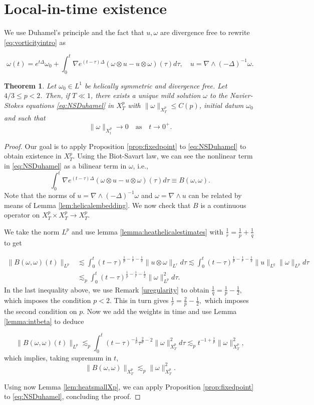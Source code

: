 \documentclass[11pt,a4paper]{article}
\newcommand{\w}{\omega}
\newcommand{\na}{\nabla}
\def\heat#1{e^{#1 \Delta}}
\newtheorem{thm}{Theorem}[section]
\begin{document}
\section{Local-in-time existence}\label{sec:localexistence}
We use Duhamel's principle and the fact that $u,\w$ are divergence free to rewrite \eqref{eq:vorticityintro} as

\begin{equation}\label{eq:NSDuhamel}
\w(t)=\heat{t}\w_0+\int_0^t\na\heat{(t-\tau)}(\w\otimes u-u\otimes \w)(\tau)d\tau, \quad u=\na\wedge(-\Delta)^{-1}\w.
\end{equation}

\begin{thm}\label{thm:existencesmallp}
Let $\w_0\in L^1$ be helically symmetric and divergence free. Let $4/3\leq p<2$. Then, if $T\ll1$, there exists a unique mild solution $\w$ to the Navier-Stokes equations \eqref{eq:NSDuhamel} in $X^p_T$ with $\|\w\|_{X^p_T}\leq C(p)$, initial datum $\w_0$ and such that
$$\|\w\|_{X^p_t}\to 0 \quad \text{as}\quad t\to 0^+.$$
\end{thm}

\begin{proof}
Our goal is to apply Proposition \ref{prop:fixedpoint} to \eqref{eq:NSDuhamel} to obtain existence in $X^p_T$. Using the Biot-Savart law, we can see the nonlinear term in \eqref{eq:NSDuhamel} as a bilinear term in $\w$, i.e., 
$$\int_0^t\na\heat{(t-\tau)}(\w\otimes u-u\otimes \w)(\tau)d\tau\equiv B(\w,\w).$$
Note that the norms of $u=\nabla\wedge(-\Delta)^{-1}\omega$ and $\w=\na\wedge u$ can be related by means of Lemma \ref{lem:helicalembedding}. We now check that $B$ is a continuous operator on $X^p_T\times X^p_T \to X^p_T$. 

We take the norm $L^p$ and use lemma \ref{lemma:heathelicalestimates} with $\frac{1}{r}=\frac{1}{p}+\frac{1}{q}$ to get

\begin{align*}
\|B(\w,\w)(t)\|_{L^p}&\lesssim \int_0^t (t-\tau)^{\frac{1}{p}-\frac{1}{r}-\frac{1}{2}}\|u\otimes \w\|_{L^r}d\tau
\lesssim \int_0^t (t-\tau)^{\frac{1}{p}-\frac{1}{r}-\frac{1}{2}}\|u\|_{L^q} \|\w\|_{L^p}d\tau \\
&\lesssim_p \int_0^t (t-\tau)^{\frac{1}{p}-\frac{1}{r}-\frac{1}{2}} \|\w\|^2_{L^p}d\tau.
\end{align*}
In the last inequality above, we use Remark \ref{uregularity} to obtain
$
\frac{1}{q}=\frac{1}{p}-\frac{1}{2},
$
which imposes the condition $p<2$. This in turn gives
$
\frac{1}{r}=\frac{2}{p}-\frac{1}{2},
$
which imposes the second condition on $p$. Now we add the weights in time and use Lemma \ref{lemma:intbeta} to deduce 

$$\|B(\w,\w)(t)\|_{L^p}\lesssim_p \int_0^t (t-\tau)^{-\frac{1}{p}}\tau^{\frac{2}{p}-2}\|\w\|_{X^p_T}^2d\tau\lesssim_p t^{-1+\frac{1}{p}}\|\w\|_{X^p_T}^2,
$$
which implies, taking supremum in $t$,
$$\|B(\w,\w)\|_{X^p_T}\lesssim_p \|\w\|_{X^p_T}^2.$$

Using now Lemma \ref{lem:heatsmallXp}, we can apply Proposition \ref{prop:fixedpoint} to \eqref{eq:NSDuhamel}, concluding the proof.
\end{proof}
\end{document}

